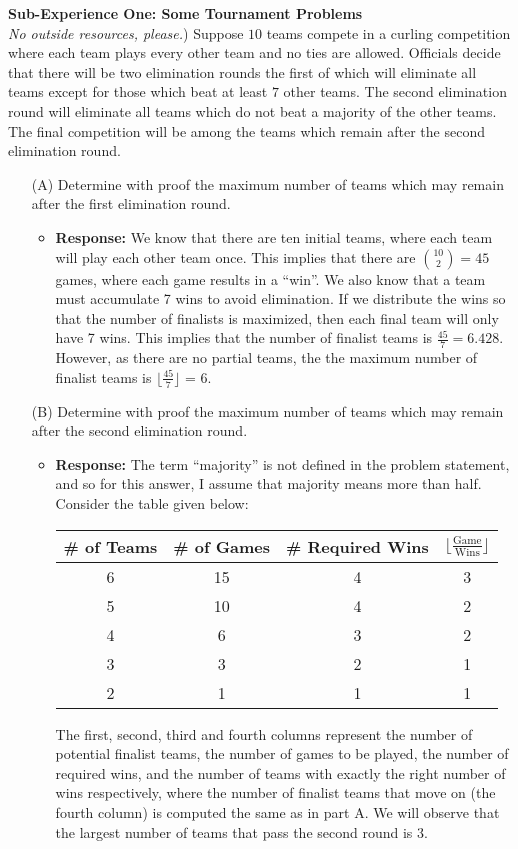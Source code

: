 \documentclass{article}
\newcommand{\response}[1]{\begin{itemize} \item {\bf Response: } #1 \end{itemize}}
\begin{document}
\noindent \maltese \hspace{1ex} {\bf Sub-Experience One: Some Tournament Problems}\\[1em]
 \emph{No outside resources, please.}) Suppose $10$ teams compete in a curling competition where each team plays every other team and no ties are allowed.  Officials decide that there will be two elimination rounds the first of which will eliminate all teams except for those which beat at least $7$ other teams.  The second elimination round will eliminate all teams which do not beat a majority of the other teams. The final competition will be among the teams which remain after the second elimination round.  
\begin{enumerate} 
	\item[(A)] Determine with proof the maximum number of teams which may remain after the first elimination round.  
		\response{We know that there are ten initial teams, where each team will play each other team once.  This implies that there are ${10 \choose 2} = 45$ games, where each game results in a ``win''. We also know that a team must accumulate 7 wins to avoid elimination. If we distribute the wins so that the number of finalists is maximized, then each final team will only have 7 wins.  This implies that the number of finalist teams is $\frac{45}{7} = 6.428$. However, as there are no partial teams, the the maximum number of finalist teams is $\lfloor \frac{45}{7} \rfloor$ = 6.}  
	\item[(B)] Determine with proof the maximum number of teams which may remain after the second elimination round.  
		\response{The term ``majority'' is not defined in the problem statement, and so for this answer, I assume that majority means more than half. Consider the table given below:\\
		\begin{center}
		\begin{tabular}{|c | c | c | c |}
			\# of Teams & \# of Games & \# Required Wins &$\lfloor \frac{\text{Game}}{\text{Wins}}\rfloor$\\ \hline
			6 & 15 & 4 & 3\\
			5 & 10 & 4 & 2\\
			4 & 6 & 3 & 2\\
			3 & 3 & 2 & 1\\
			2 & 1 & 1 & 1\\
		\end{tabular}
		\end{center}
		The first, second, third and fourth columns represent the number of potential finalist teams, the number of games to be played, the number of required wins, and the number of teams with exactly the right number of wins respectively, where the number of finalist teams that move on (the fourth column) is computed the same as in part A. We will observe that the largest number of teams that pass the second round is $3$.}
\end{enumerate} 
\end{document}
